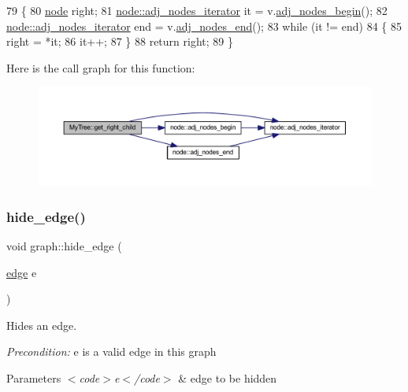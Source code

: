 \begin{DoxyCode}
79 \{
80     \mbox{\hyperlink{classnode}{node}} right;
81     \mbox{\hyperlink{classnode_a392f19ea6dfa344bdf5c4d5a4b25eb8c}{node::adj\_nodes\_iterator}} it = v.\mbox{\hyperlink{classnode_a6cd2febf910bc6572c4aecba6278b100}{adj\_nodes\_begin}}();
82     \mbox{\hyperlink{classnode_a392f19ea6dfa344bdf5c4d5a4b25eb8c}{node::adj\_nodes\_iterator}} end = v.\mbox{\hyperlink{classnode_a2477fa92c56a19d29464082444a3043a}{adj\_nodes\_end}}();
83     \textcolor{keywordflow}{while} (it != end)
84     \{
85         right = *it;
86         it++;
87     \}
88     \textcolor{keywordflow}{return} right;
89 \}
\end{DoxyCode}
Here is the call graph for this function\+:\nopagebreak
\begin{figure}[H]
\begin{center}
\leavevmode
\includegraphics[width=350pt]{class_my_tree_a5daf167d4bab0c1b0ca9b25cd3c45065_cgraph}
\end{center}
\end{figure}
\mbox{\label{classgraph_ab2f8520bcac080d73c55228fecc61825}} 
\subsubsection{\texorpdfstring{hide\+\_\+edge()}{hide\_edge()}}
{\footnotesize\ttfamily void graph\+::hide\+\_\+edge (\begin{DoxyParamCaption}\item[{\mbox{\hyperlink{classedge}{edge}}}]{e }\end{DoxyParamCaption})\hspace{0.3cm}{\ttfamily [inherited]}}

Hides an edge.

{\itshape Precondition\+:} {\ttfamily e} is a valid edge in this graph


\begin{DoxyParams}{Parameters}
{\em $<$code$>$e$<$/code$>$} & edge to be hidden \\
\hline
\end{DoxyParams}


